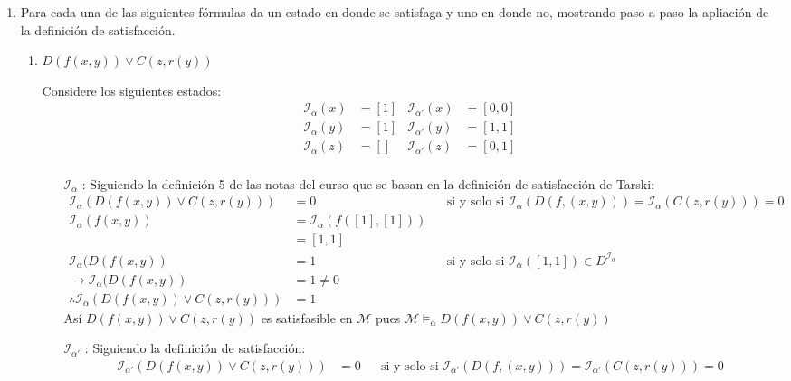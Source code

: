 \documentclass[8pt, letterpaper]{article}
\begin{document}
\begin{enumerate}
\item Para cada una de las siguientes fórmulas da un estado
  en donde se satisfaga y uno en donde no, mostrando paso a paso la apliación
  de la definición de satisfacción.
  \begin{enumerate}
  \item $D(f(x,y)) \lor C(z, r(y))$
    
    Considere los siguientes estados:
    \begin{align*}
      \mathcal{I}_\alpha(x) &= [1] & \mathcal{I}_{\alpha'}(x) &= [0,0]\\
      \mathcal{I}_\alpha(y) &= [1] & \mathcal{I}_{\alpha'}(y) &= [1, 1]\\
      \mathcal{I}_\alpha(z) &= [] & \mathcal{I}_{\alpha'}(z) &= [0,1]\\
    \end{align*}
    \begin{itemize}
    \item[$\mathcal{I}_\alpha$]:
      Siguiendo la definición 5 de las notas del curso que se basan en la
      definición de satisfacción de Tarski:
      \begin{align*}
        \mathcal{I}_\alpha(D(f(x,y)) \lor C(z, r(y))) &= 0 & &\text{si y solo si }\mathcal{I}_\alpha(D(f,(x,y))) = \mathcal{I}_\alpha(C(z, r(y))) = 0\\
        \mathcal{I}_\alpha(f(x,y)) &= \mathcal{I}_\alpha(f([1],[1]))\\
        &= [1,1]\\
        \mathcal{I}_\alpha(D(f(x,y)) &= 1 & &\text{si y solo si }\mathcal{I}_\alpha([1,1])\in D^\mathcal{I_\alpha}\\
        \rightarrow \mathcal{I}_\alpha(D(f(x,y)) &= 1 \neq 0 \\
        \therefore \mathcal{I}_\alpha(D(f(x,y)) \lor C(z, r(y))) &= 1
      \end{align*}
      Así $D(f(x,y)) \lor C(z, r(y))$ es satisfasible en $\mathcal{M}$ pues $\mathcal{M} \models_\alpha D(f(x,y)) \lor C(z, r(y))$
      \\
    \item[$\mathcal{I}_{\alpha'}$]:
      Siguiendo la definición de satisfacción:
      \begin{align*}
        \mathcal{I}_{\alpha'}(D(f(x,y)) \lor C(z, r(y))) &= 0 & &\text{si y solo si }\mathcal{I}_{\alpha'}(D(f,(x,y))) = \mathcal{I}_{\alpha'}(C(z, r(y))) = 0\\

\end{align*}
\end{itemize}
\end{enumerate}
\end{enumerate}
\end{document}
